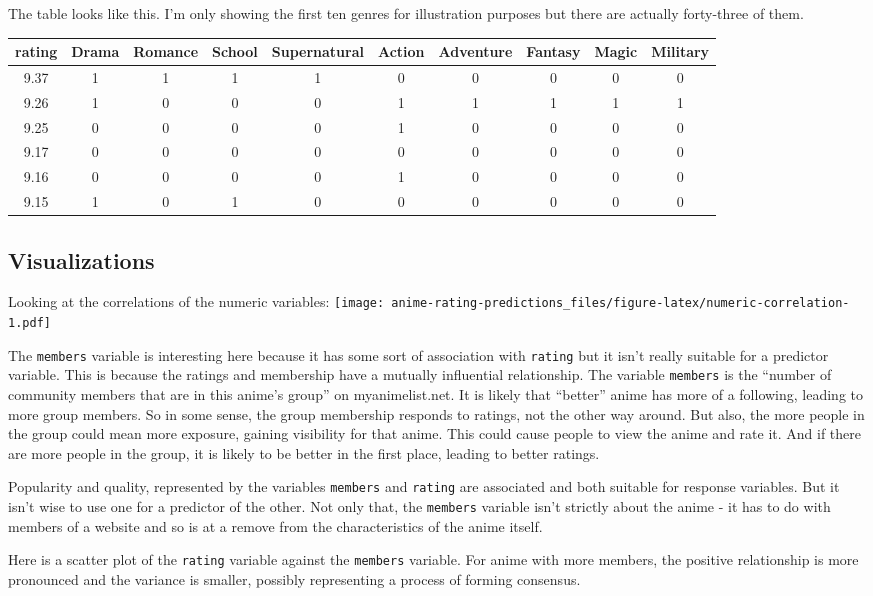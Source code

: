 \documentclass[
]{article}
\begin{document}
The table looks like this. I'm only showing the first ten genres for
illustration purposes but there are actually forty-three of them.

\begin{longtable}[]{@{}cccccccccc@{}}
\toprule
rating & Drama & Romance & School & Supernatural & Action & Adventure &
Fantasy & Magic & Military\tabularnewline
\midrule
\endhead
9.37 & 1 & 1 & 1 & 1 & 0 & 0 & 0 & 0 & 0\tabularnewline
9.26 & 1 & 0 & 0 & 0 & 1 & 1 & 1 & 1 & 1\tabularnewline
9.25 & 0 & 0 & 0 & 0 & 1 & 0 & 0 & 0 & 0\tabularnewline
9.17 & 0 & 0 & 0 & 0 & 0 & 0 & 0 & 0 & 0\tabularnewline
9.16 & 0 & 0 & 0 & 0 & 1 & 0 & 0 & 0 & 0\tabularnewline
9.15 & 1 & 0 & 1 & 0 & 0 & 0 & 0 & 0 & 0\tabularnewline
\bottomrule
\end{longtable}

\hypertarget{visualizations}{%
\subsection{Visualizations}\label{visualizations}}

Looking at the correlations of the numeric variables:
\texttt{[image: anime-rating-predictions\_files/figure-latex/numeric-correlation-1.pdf]}

The \texttt{members} variable is interesting here because it has some
sort of association with \texttt{rating} but it isn't really suitable
for a predictor variable. This is because the ratings and membership
have a mutually influential relationship. The variable \texttt{members}
is the ``number of community members that are in this anime's group'' on
myanimelist.net. It is likely that ``better'' anime has more of a
following, leading to more group members. So in some sense, the group
membership responds to ratings, not the other way around. But also, the
more people in the group could mean more exposure, gaining visibility
for that anime. This could cause people to view the anime and rate it.
And if there are more people in the group, it is likely to be better in
the first place, leading to better ratings.

Popularity and quality, represented by the variables \texttt{members}
and \texttt{rating} are associated and both suitable for response
variables. But it isn't wise to use one for a predictor of the other.
Not only that, the \texttt{members} variable isn't strictly about the
anime - it has to do with members of a website and so is at a remove
from the characteristics of the anime itself.

Here is a scatter plot of the \texttt{rating} variable against the
\texttt{members} variable. For anime with more members, the positive
relationship is more pronounced and the variance is smaller, possibly
representing a process of forming consensus.
\end{document}
